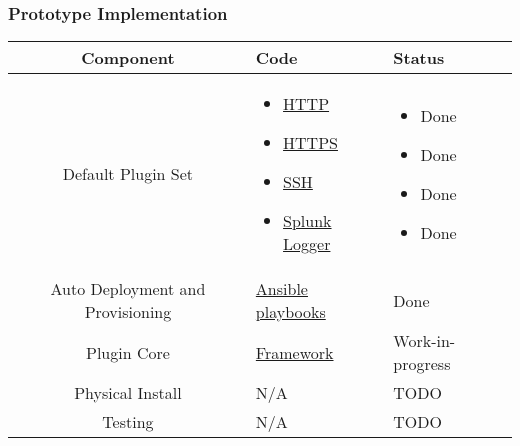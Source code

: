 \begin{frame}
\frametitle{Prototype Implementation}

\begin{table}
\centering
\small
\begin{tabularx}{\linewidth}{c X X}
\toprule
\textbf{Component} & \textbf{Code} & \textbf{Status} \\
\midrule
Default Plugin Set & \begin{itemize}[leftmargin=-0.3mm,after=\vspace{-\baselineskip},noitemsep,nolistsep]
                         \item[] \href{https://github.com/Senior-Design-May1601/webauth}{HTTP}
                         \item[] \href{https://github.com/Senior-Design-May1601/webauth}{HTTPS}
                         \item[] \href{https://github.com/Senior-Design-May1601/fssh}{SSH}
                         \item[] \href{https://github.com/Senior-Design-May1601/Splunk}{Splunk Logger}
                     \end{itemize} &
                    \begin{itemize}[leftmargin=-0.3mm,after=\vspace{-\baselineskip},noitemsep,nolistsep]
                         \item[] \textcolor{ao(english)}{Done}
                         \item[] \textcolor{ao(english)}{Done}
                         \item[] \textcolor{ao(english)}{Done}
                         \item[] \textcolor{ao(english)}{Done}
                     \end{itemize} \\ \hline
Auto Deployment and Provisioning & \href{https://github.com/Senior-Design-May1601/config}{Ansible playbooks} & \textcolor{ao(english)}{Done} \\ \hline
Plugin Core & \href{https://github.com/Senior-Design-May1601/projectmain}{Framework} & \textcolor{aureolin}{Work-in-progress} \\ \hline
Physical Install & N/A & \textcolor{bostonuniversityred}{TODO} \\ \hline
Testing & N/A & \textcolor{bostonuniversityred}{TODO} \\
\bottomrule
\end{tabularx}
\end{table}
\end{frame}

